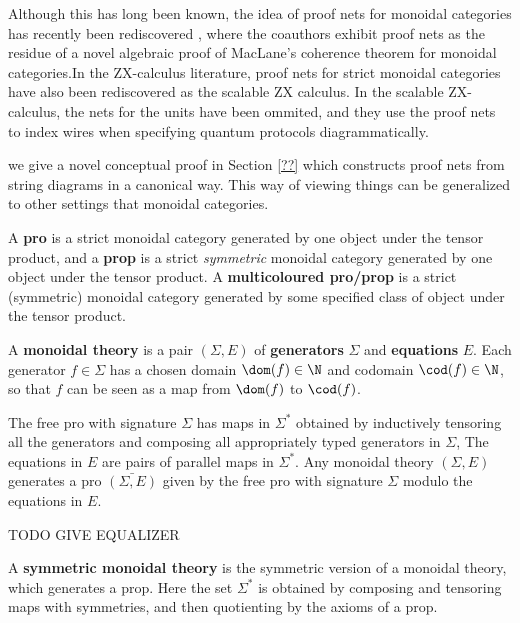 Although this has long been known, the idea of proof nets for monoidal categories has recently been rediscovered \cite{wilson}, where the coauthors exhibit proof nets as the residue of a novel algebraic proof of MacLane's coherence theorem for monoidal categories.In the ZX-calculus literature, proof nets for strict monoidal categories have also been rediscovered as the scalable ZX calculus.  In the scalable ZX-calculus, the nets for the units have been ommited, and they use the proof nets to index wires when specifying quantum protocols diagrammatically.

 we give a novel conceptual proof in Section \ref{??} which constructs proof nets from string diagrams in a canonical way.  This way of viewing things can be generalized to other settings that monoidal categories.


\begin{definition}
\label{def:pro}
A {\bf pro} is a strict monoidal category generated by one object under the tensor product, and a {\bf prop} is a  strict {\em symmetric} monoidal category generated by one object under the tensor product.  A {\bf multicoloured pro/prop} is a strict (symmetric) monoidal category generated by some specified class of object under the tensor product.
\end{definition}


\begin{definition}
\label{def:monoidaltheory}

A {\bf monoidal theory} is a pair $(\Sigma,E)$ of {\bf generators} $\Sigma$ and {\bf equations} $E$.
Each generator $f \in \Sigma$ has a chosen domain $\dom (f) \in \N$  and codomain $\cod (f) \in \N$, so that $f$ can be seen as a map from $\dom(f)$ to $\cod (f)$.

The free pro with signature $\Sigma$ has maps in $\Sigma^*$ obtained by inductively  tensoring all the generators and composing all appropriately typed generators in $\Sigma$,
The equations in $E$ are pairs of parallel maps in $\Sigma^*$.
Any monoidal theory $(\Sigma,E)$  generates a pro $\bar{(\Sigma,E)}$ given by the free pro with signature $\Sigma$ modulo the equations in $E$.

TODO GIVE EQUALIZER

A {\bf symmetric monoidal theory} is the symmetric version of a monoidal theory, which generates a prop.  Here the set $\Sigma^*$ is obtained by composing and tensoring maps with symmetries, and then quotienting by the axioms of a prop.

\end{definition}


